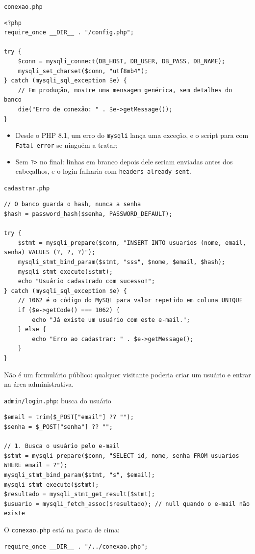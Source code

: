 \documentclass{beamer}
\begin{document}
\begin{frame}[fragile]{\texttt{conexao.php}}
	\begin{verbatim}
<?php
require_once __DIR__ . "/config.php";

try {
    $conn = mysqli_connect(DB_HOST, DB_USER, DB_PASS, DB_NAME);
    mysqli_set_charset($conn, "utf8mb4");
} catch (mysqli_sql_exception $e) {
    // Em produção, mostre uma mensagem genérica, sem detalhes do banco
    die("Erro de conexão: " . $e->getMessage());
}
	\end{verbatim}

	\begin{itemize}
		\item Desde o PHP 8.1, um erro do \texttt{mysqli} lança uma exceção, e o
		      script para com \texttt{Fatal error} se ninguém a tratar;
		\item Sem \texttt{?>} no final: linhas em branco depois dele seriam
		      enviadas antes dos cabeçalhos, e o login falharia com
		      \texttt{headers already sent}.
	\end{itemize}
\end{frame}

\begin{frame}[fragile]{\texttt{cadastrar.php}}
	\begin{verbatim}
// O banco guarda o hash, nunca a senha
$hash = password_hash($senha, PASSWORD_DEFAULT);

try {
    $stmt = mysqli_prepare($conn, "INSERT INTO usuarios (nome, email, senha) VALUES (?, ?, ?)");
    mysqli_stmt_bind_param($stmt, "sss", $nome, $email, $hash);
    mysqli_stmt_execute($stmt);
    echo "Usuário cadastrado com sucesso!";
} catch (mysqli_sql_exception $e) {
    // 1062 é o código do MySQL para valor repetido em coluna UNIQUE
    if ($e->getCode() === 1062) {
        echo "Já existe um usuário com este e-mail.";
    } else {
        echo "Erro ao cadastrar: " . $e->getMessage();
    }
}
	\end{verbatim}

	Não é um formulário público: qualquer visitante poderia criar um usuário e
	entrar na área administrativa.
\end{frame}

\begin{frame}[fragile]{\texttt{admin/login.php}: busca do usuário}
	\begin{verbatim}
$email = trim($_POST["email"] ?? "");
$senha = $_POST["senha"] ?? "";

// 1. Busca o usuário pelo e-mail
$stmt = mysqli_prepare($conn, "SELECT id, nome, senha FROM usuarios WHERE email = ?");
mysqli_stmt_bind_param($stmt, "s", $email);
mysqli_stmt_execute($stmt);
$resultado = mysqli_stmt_get_result($stmt);
$usuario = mysqli_fetch_assoc($resultado); // null quando o e-mail não existe
	\end{verbatim}

	O \texttt{conexao.php} está na pasta de cima:
	\begin{verbatim}
require_once __DIR__ . "/../conexao.php";
	\end{verbatim}
\end{frame}
\end{document}
